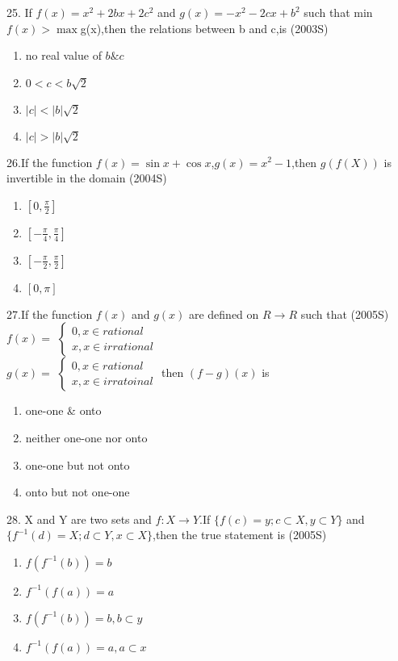 \documentclass[journal,12pt,twocolumn]{IEEEtran}
\theoremstyle{remark}
\begin{document}
25. If $f(x)=x^2+2bx+2c^2$ and $g(x)=-x^2-2cx+b^2$ such that min $f(x)> \max $g(x),then the relations between b and c,is
\hfill(2003S)\\
\begin{enumerate}
    \item no real value of $b\& c$
    \item $0<c<b\sqrt{2}$
    \item $|c|<|b|\sqrt{2}$
    \item $|c|>|b|\sqrt{2}$
\end{enumerate}
26.If the function $f(x)=\sin x+\cos x$,$g(x)=x^2-1$,then $g(f(X))$ is invertible in the domain 
\hfill(2004S)\\
\begin{enumerate}
    \item $\left[0,\frac{\pi}{2}\right]$\\
    \item $\left[-\frac{\pi}{4},\frac{\pi}{4}\right]$\\
    \item $\left[-\frac{\pi}{2},\frac{\pi}{2}\right]$\\
    \item $[0,\pi]$
\end{enumerate}
27.If the function $f(x)$ and $g(x)$ are defined on $R \rightarrow R $ such that
\hfill(2005S)
\\$f(x)=$
$ \begin{cases}
    0, x \in rational\\
    x, x \in irrational 
\end{cases} $ \\
    $g(x)=$
$\begin{cases}
    0,x \in rational\\
    x,x \in irratoinal
\end{cases}$
then $(f-g)(x)$ is 
\begin{enumerate}
    \item one-one \& onto 
    \item neither one-one nor onto
    \item one-one but not onto 
    \item onto but not one-one
\end{enumerate}
28. X and Y are two sets and $f:X\rightarrow Y$.If $ \{f(c)=y;c \subset X,y \subset Y\} $ and $ \{f^{-1}(d)=X;d \subset Y,x \subset X \} $,then the true statement is 
\hfill(2005S)\\
\begin{enumerate}
    \item $f(f^{-1}(b))=b$
    \item $f^{-1}(f(a))=a$
    \item $f(f^{-1}(b))=b,b \subset y$
    \item $f^{-1}(f(a))=a,a \subset x$
\end{enumerate}
\end{document}
